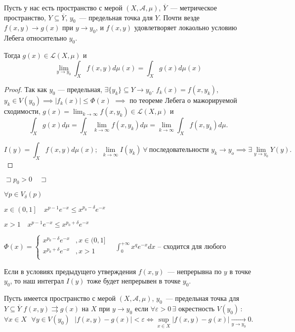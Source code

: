 \begin{statement}
    Пусть у нас есть пространство с мерой $(X, \mathscr{A}, \mu)$, 
    $\overline{Y}$~--- метрическое пространство, $Y \subseteq \overline{Y}$, 
    $ y_0$~--- предельная точка для $Y$.
    Почти везде $f(x,y ) \to g(x)$ при $y \to y_0$, и $f(x, y) $ удовлетворяет локаольно условию Лебега относительно $y_0$. 

    Тогда $g(x) \in \mathscr{L}(X, \mu)$ и
    \[\lim_{y \to y_0} \int_X f(x, y) d\mu(x) = \int_X g(x) d\mu(x)\]  
\end{statement}
\begin{proof}
    Так как $y_0$ --- предельная, $\exists \{y_k\}\subseteq Y \to y_0$.
    $f_k(x) = f(x, y_k)$, $y_k \in V(y_0) \implies |f_k(x) | \leqslant \Phi(x)$
    $\implies$ по теореме Лебега о мажорируемой сходимости,
    $g(x) = \lim_{k\to\infty} f(x, y_k) \in \mathcal{L}(X, \mu)$ и
    \[\int_X g(x) d\mu =\int_X \lim_{k\to\infty} f(x, y_k) d\mu = \lim_{k\to\infty} \int_X f(x, y_k) d\mu . \]

    \[I(y) = \int_X f(x, y) d\mu(x);~~ \lim_{k\to\infty} I(y_k) ~\forall ~ \text{последовательности } y_k \to y_o \implies \exists \lim_{y\to y_0} Y(y).\]
\end{proof}
\begin{example}
    $\sqsupset p_0 >0\quad \sqsupset $

    $\forall p\in V_{\delta}(p)$
    
    $x\in \left( 0, 1 \right]\quad x^{p-1}e^{-x} \leqslant x^{p_0 - \delta}e^{-x}$

    $x > 1\quad x^{p-1}e^{-x} \leqslant x^{p_0 + \delta}e^{-x}$ 

    $\Phi(x) = \begin{cases}
        x^{p_0 - \delta}e^{-x}&, x\in (0,1]\\
        x^{p_0 + \delta}e^{-x}&, x > 1\\
    \end{cases}\quad \int_0^{+\infty }x^qe^{-x}dx$ -- сходится для любого 
\end{example}

\begin{note}
    Если в условиях предыдущего утверждения $f(x, y)$~--- непрерывна по $y$ в точке $y_0$, 
    то наш интеграл $I(y)$ тоже будет непрерывен в точке $y_0$. 
\end{note}

\begin{definition}
    Пусть имеется пространство с мерой $(X, \mathscr{A}, \mu)$, $y_0$~--- предельная точка для $Y\subseteq \overline{Y}$
    $f(x,y ) \rightrightarrows g(x)$ на $X$ при $y\to y_0$ если 
    $\forall \varepsilon > 0 \, \exists $ окрестность $V(y_0)$\,:
    \[ \forall x \in X~~~ \forall y \in V(y_0) ~~~ |f(x,y) -g (x) | < \varepsilon \iff \sup_{x\in X} |f(x, y) - g(x) | \underset{y\to y_0}{\to} 0. \]
\end{definition}

